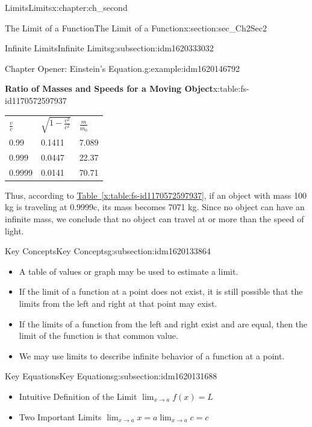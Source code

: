 \documentclass[oneside,10pt,]{book}
\newcommand{\tabularfont}{\relax}
\newcommand{\xreffont}{\relax}
\numberwithin{equation}{section}
\begin{document}
\begin{chapterptx}{Limits}{}{Limits}{}{}{x:chapter:ch_second}
\begin{sectionptx}{The Limit of a Function}{}{The Limit of a Function}{}{}{x:section:sec_Ch2Sec2}
\begin{subsectionptx}{Infinite Limits}{}{Infinite Limits}{}{}{g:subsection:idm1620333032}
\begin{example}{Chapter Opener: Einstein’s Equation.}{g:example:idm1620146792}
\begin{tableptx}{\textbf{Ratio of Masses and Speeds for a Moving Object}}{x:table:fs-id1170572597937}{}%
\centering%
{\tabularfont%
\begin{tabular}{lll}
\textbf{\(\frac{v}{c}\)}&\textbf{\(\sqrt{1-\frac{v^2}{c^2}}\)}&\textbf{\(\frac{m}{m_0}\)}\tabularnewline[0pt]
0.99&0.1411&7.089\tabularnewline[0pt]
0.999&0.0447&22.37\tabularnewline[0pt]
0.9999&0.0141&70.71
\end{tabular}
}%
\end{tableptx}%
Thus, according to \hyperref[x:table:fs-id1170572597937]{Table~{\xreffont\ref{x:table:fs-id1170572597937}}}, if an object with mass 100 kg is traveling at 0.9999c, its mass becomes 7071 kg. Since no object can have an infinite mass, we conclude that no object can travel at or more than the speed of light.%
\end{example}
\end{subsectionptx}
%
%
\typeout{************************************************}
\typeout{************************************************}
%
\begin{subsectionptx}{Key Concepts}{}{Key Concepts}{}{}{g:subsection:idm1620133864}
%
\begin{itemize}[label=\textbullet]
\item{}A table of values or graph may be used to estimate a limit.%
\item{}If the limit of a function at a point does not exist, it is still possible that the limits from the left and right at that point may exist.%
\item{}If the limits of a function from the left and right exist and are equal, then the limit of the function is that common value.%
\item{}We may use limits to describe infinite behavior of a function at a point.%
\end{itemize}
\end{subsectionptx}
%
%
\typeout{************************************************}
\typeout{************************************************}
%
\begin{subsectionptx}{Key Equations}{}{Key Equations}{}{}{g:subsection:idm1620131688}
%
\begin{itemize}[label=\textbullet]
\item{}Intuitive Definition of the Limit \(\lim_{x \to a} f(x)=L\)%
\item{}Two Important Limits \(\lim_{x \to a} x=a \lim_{x \to a} c=c\)%

\end{itemize}
\end{subsectionptx}
\end{sectionptx}
\end{chapterptx}
\end{document}
